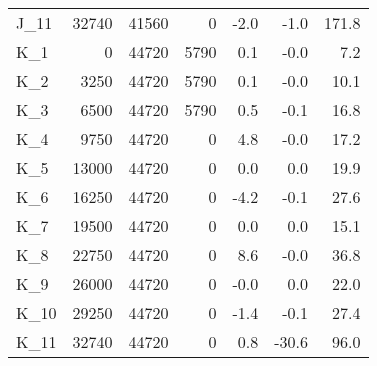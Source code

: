 \begin{tabular}{lrrrrrr}
J\_11 & 32740 & 41560 & 0 & -2.0 & -1.0 & 171.8 \\
K\_1 & 0 & 44720 & 5790 & 0.1 & -0.0 & 7.2 \\
K\_2 & 3250 & 44720 & 5790 & 0.1 & -0.0 & 10.1 \\
K\_3 & 6500 & 44720 & 5790 & 0.5 & -0.1 & 16.8 \\
K\_4 & 9750 & 44720 & 0 & 4.8 & -0.0 & 17.2 \\
K\_5 & 13000 & 44720 & 0 & 0.0 & 0.0 & 19.9 \\
K\_6 & 16250 & 44720 & 0 & -4.2 & -0.1 & 27.6 \\
K\_7 & 19500 & 44720 & 0 & 0.0 & 0.0 & 15.1 \\
K\_8 & 22750 & 44720 & 0 & 8.6 & -0.0 & 36.8 \\
K\_9 & 26000 & 44720 & 0 & -0.0 & 0.0 & 22.0 \\
K\_10 & 29250 & 44720 & 0 & -1.4 & -0.1 & 27.4 \\
K\_11 & 32740 & 44720 & 0 & 0.8 & -30.6 & 96.0 \\
\bottomrule
\end{tabular}
